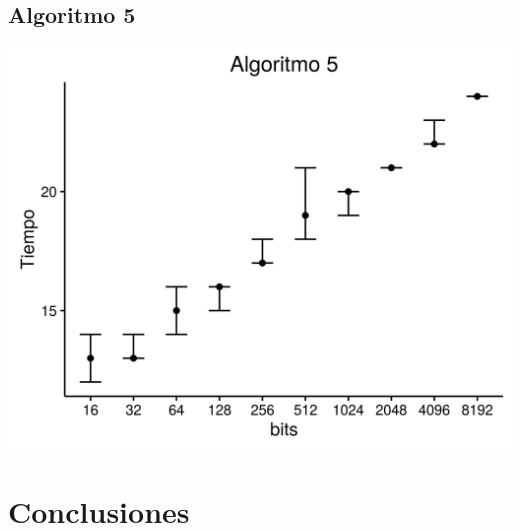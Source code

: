 \documentclass[12pt,letterpaper]{scrartcl}
\begin{document}
\newpage


\subsection{Algoritmo 5}

\begin{center}
	\includegraphics[scale=1]{plot/a5.png}
\end{center}	

\newpage



\section{Conclusiones}
\end{document}
